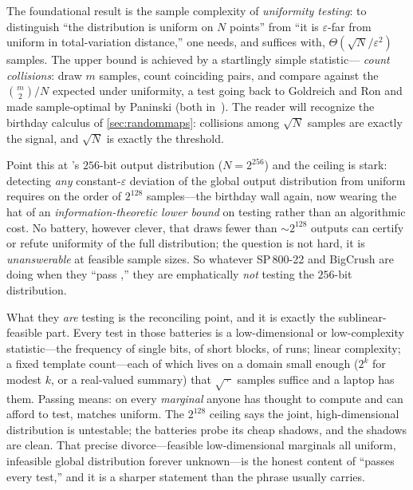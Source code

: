 The foundational result is the sample complexity of \emph{uniformity
testing}: to distinguish ``the distribution is uniform on $N$ points''
from ``it is $\varepsilon$-far from uniform in total-variation
distance,'' one needs, and suffices with, $\Theta(\sqrt{N}/\varepsilon^{2})$
samples. The upper bound is achieved by a startlingly simple statistic---%
\emph{count collisions}: draw $m$ samples, count coinciding pairs, and
compare against the $\binom{m}{2}/N$ expected under uniformity, a test
going back to Goldreich and Ron and made sample-optimal by Paninski
(both in~\citealp{Canonne2020}). The reader will recognize the birthday
calculus of \cref{sec:randommaps}: collisions among $\sqrt{N}$ samples
are exactly the signal, and $\sqrt{N}$ is exactly the threshold.

Point this at \SHA{}'s $256$-bit output distribution ($N = 2^{256}$) and
the ceiling is stark: detecting \emph{any} constant-$\varepsilon$
deviation of the global output distribution from uniform requires on the
order of $2^{128}$ samples---the birthday wall again, now wearing the
hat of an \emph{information-theoretic lower bound} on testing rather than
an algorithmic cost. No battery, however clever, that draws fewer than
$\sim 2^{128}$ outputs can certify or refute uniformity of the full
distribution; the question is not hard, it is \emph{unanswerable} at
feasible sample sizes. So whatever SP\,800-22 and BigCrush are doing when
they ``pass \SHA{},'' they are emphatically \emph{not} testing the
$256$-bit distribution.

What they \emph{are} testing is the reconciling point, and it is exactly
the sublinear-feasible part. Every test in those batteries is a
low-dimensional or low-complexity statistic---the frequency of single
bits, of short blocks, of runs; linear complexity; a fixed template
count---each of which lives on a domain small enough ($2^{k}$ for modest
$k$, or a real-valued summary) that $\sqrt{\,\cdot\,}$ samples suffice
and a laptop has them. Passing means: on every \emph{marginal} anyone has
thought to compute and can afford to test, \SHA{} matches uniform. The
$2^{128}$ ceiling says the joint, high-dimensional distribution is
untestable; the batteries probe its cheap shadows, and the shadows are
clean. That precise divorce---feasible low-dimensional marginals all
uniform, infeasible global distribution forever unknown---is the honest
content of ``passes every test,'' and it is a sharper statement than the
phrase usually carries.

